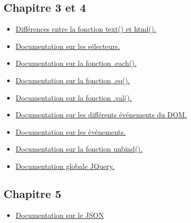 \documentclass{article}[12pt]
\begin{document}
\subsection{Chapitre 3 et 4}
\begin{itemize}
	\item \href{http://stackoverflow.com/questions/1910794/what-is-the-difference-between-jquery-text-and-html}{Différences entre la fonction text() et html().}
    \item \href{http://api.jquery.com/category/selectors/}{Documentation sur les sélecteurs.}
    \item \href{http://api.jquery.com/each/}{Documentation sur la fonction .each().}
    \item \href{http://api.jquery.com/eq/}{Documentation sur la fonction .eq().}
    \item \href{http://api.jquery.com/val/}{Documentation sur la fonction .val().}
    \item \href{http://www.w3schools.com/jsref/dom_obj_event.asp}{Documentation sur les différents événements du DOM.}
    \item \href{http://api.jquery.com/category/events/}{Documentation sur les événements.}
    \item \href{http://api.jquery.com/unbind/}{Documentation sur la fonction unbind().}
    \item \href{https://api.jquery.com}{Documentation globale JQuery.}
\end{itemize}
\subsection{Chapitre 5}
\begin{itemize}
	\item \href{http://json.org}{Documentation sur le JSON} 
\end{itemize}
\end{document}

